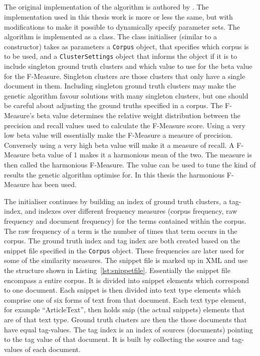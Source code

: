 \subsection{\CTC}
The original implementation of the \CTC algorithm is authored by \cite{Moe2014}. The implementation used in this thesis work is more or less the same, but with modifications to make it possible to dynamically specify parameter sets. The \CTC algorithm is implemented as a class. The class initialiser (similar to a constructor) takes as parameters a \texttt{Corpus} object, that specifies which corpus is to be used, and a \texttt{ClusterSettings} object that informs the \CTC object if it is to include singleton ground truth clusters and which value to use for the beta value for the F-Measure. Singleton clusters are those clusters that only have a single document in them. Including singleton ground truth clusters may make the genetic algorithm favour solutions with many singleton clusters, but one should be careful about adjusting the ground truths specified in a corpus. The F-Measure's beta value determines the relative weight distribution between the precision and recall values used to calculate the F-Measure score. Using a very low beta value will essentially make the F-Measure a measure of precision. Conversely using a very high beta value will make it a measure of recall. A F-Measure beta value of 1 makes it a harmonious mean of the two. The measure is then called the harmonious F-Measure. The value can be used to tune the kind of results the genetic algorithm optimise for. In this thesis the harmonious F-Measure has been used.

The initialiser continues by building an index of ground truth clusters, a tag-index, and indexes over different frequency measures (corpus frequency, raw frequency and document frequency) for the terms contained within the corpus. The raw frequency of a term is the number of times that term occurs in the corpus. The ground truth index and tag index are both created based on the snippet file specified in the \texttt{Corpus} object. These frequencies are later used for some of the similarity measures. The snippet file is marked up in XML and use the structure shown in Listing~\ref{lst:snippetfile}. Essentially the snippet file encompass a entire corpus. It is divided into snippet elements which correspond to one document. Each snippet is then divided into text type elements which comprise one of six forms of text from that document. Each text type element, for example ``ArticleText'', then holds snip (the actual snippets) elements that are of that text type. Ground truth clusters are then the those documents that have equal tag-values. The tag index is an index of sources (documents) pointing to the tag value of that document. It is built by collecting the source and tag-values of each document.

